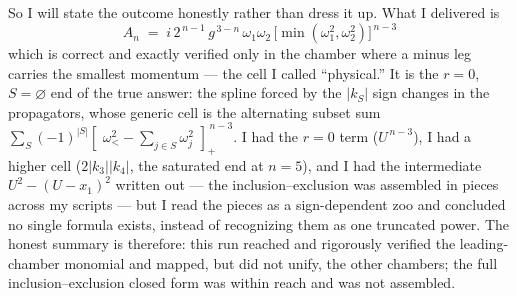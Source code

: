 \documentclass{article}
\newcommand{\pp}[1]{\left[\,#1\,\right]_{+}}
\begin{document}
So I will state the outcome honestly rather than dress it up. What I delivered is
\[
\boxed{\;
A_n \;=\; i\,2^{\,n-1}\,g^{\,3-n}\,\omega_1\omega_2\,
\big[\min(\omega_1^2,\omega_2^2)\big]^{\,n-3}\;}
\]
which is correct and exactly verified only in the chamber where a minus leg
carries the smallest momentum --- the cell I called ``physical.'' It is the
$r=0$, $S=\varnothing$ end of the true answer: the spline forced by the $|k_S|$
sign changes in the propagators, whose generic cell is the alternating subset sum
$\sum_{S}(-1)^{|S|}\pp{\,\omega_<^2-\sum_{j\in S}\omega_j^2\,}^{\,n-3}$. I had the
$r=0$ term ($U^{\,n-3}$), I had a higher cell ($2|k_3||k_4|$, the saturated end at
$n=5$), and I had the intermediate $U^2-(U-x_1)^2$ written out --- the
inclusion--exclusion was assembled in pieces across my scripts --- but I read the
pieces as a sign-dependent zoo and concluded no single formula exists, instead of
recognizing them as one truncated power. The honest summary is therefore: this run
reached and rigorously verified the leading-chamber monomial and mapped, but did
not unify, the other chambers; the full inclusion--exclusion closed form was
within reach and was not assembled.
\end{document}
